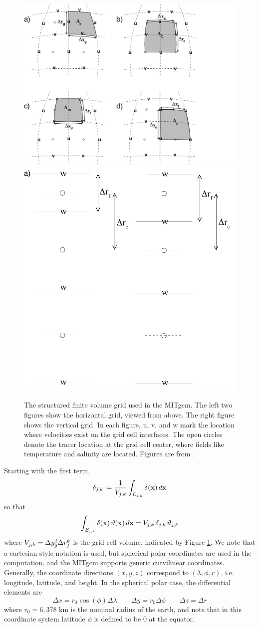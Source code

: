 \begin{figure}
    \centering
    \includegraphics[width=.6\textwidth]{../figures/hgrid-abcd.pdf}
    \includegraphics[width=.2\textwidth]{../figures/vgrid-accur-center.pdf}
    \caption{The structured finite volume grid used in the MITgcm. The
        left two figures show the horizontal grid, viewed from above. The right
        figure shows the vertical grid. In each figure, u, v, and w mark the
        location where velocities exist on the grid cell interfaces. The open
        circles denote the tracer location at the grid cell center,
        where fields like temperature and salinity are located. Figures are from
    \citet{campin_mitgcmmitgcm_2021}.}
    \label{fig:mitgcm_grid}
\end{figure}

Starting with the first term,
\begin{equation*}
    \delta_{j,k} \coloneqq \dfrac{1}{V_{j,k}}\int_{E_{j,k}}\delta(\mathbf{x})\,d\mathbf{x}
\end{equation*}
so that
\begin{equation*}
    \int_{E_{j,k}} \delta(\mathbf{x})\,\vartheta(\mathbf{x})\, d\mathbf{x} =
    V_{j,k}\,\delta_{j,k}\,\vartheta_{j,k}
\end{equation*}
where $V_{j,k} = \Delta y^{j}_{g} \Delta r_f^k$ is the grid cell volume,
indicated by Figure \ref{fig:mitgcm_grid}.
We note that a cartesian style notation
is used, but spherical polar coordinates are used in the computation, and the
MITgcm supports generic curvilinear coordinates.
Generally, the coordinate directions $(x,y,z)$ correspond to $(\lambda,\phi,r)$,
i.e. longitude, latitude, and height.
In the spherical polar case, the differential elements are
\begin{equation*}
    \Delta x = r_0 \cos(\phi)\Delta\lambda \qquad
    \Delta y = r_0 \Delta \phi \qquad
    \Delta z = \Delta r
\end{equation*}
where $r_0 = 6,378$ km is the nominal radius of the earth, and note that in this
coordinate system latitude $\phi$ is defined to be 0 at the equator.

